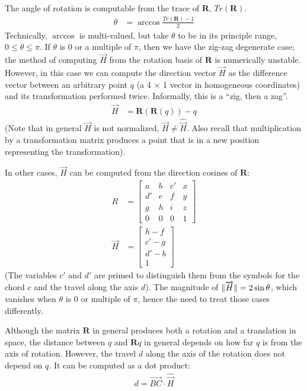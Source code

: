 \documentclass[11pt]{article}
\DeclarePairedDelimiter{\norm}{\lVert}{\rVert}
\begin{document}
{The angle of rotation is computable from the trace of $\bm{R}$, $Tr(\bm{R})$.
\begin{align}
  \theta &= \arccos{\frac{Tr(\bm{R}) - 1}{2}}
\end{align}
Technically, $\arccos$ is multi-valued, but take $\theta$
to be in its principle range, $0 \leq \theta \leq \pi$.
If $\theta$ is $0$ or a multiple of $\pi$, then we have the zig-zag
degenerate case; the method of computing $\overrightarrow{H}$ from the rotation
basis of $\bm{R}$ is numerically unstable.
However, in this case
we can compute the direction vector $\overrightarrow{H}$ as the difference vector
between an arbitrary point $q$ (a 4 $\times$ 1 vector in homogeneous coordinates)
and its transformation performed
twice. Informally, this is a ``zig, then a zag''.
\begin{align}
  \overrightarrow{H} &= \bm{R} ( \bm{R}( q)) - q
\end{align}
(Note that in general $\overrightarrow{H}$ is not normalized, $\overrightarrow{H} \neq \hat{\overrightarrow{H}}$.
Also recall that multiplication by a transformation matrix
produces a point that is in a new position representing
the transformation).

In other cases, $\overrightarrow{H}$ can be computed from the direction
cosines of $\bm{R}$\cite{wiki:rotation}:
\begin{align}
  R &=     \begin{bmatrix} a & b & c' & x \\ d' & e & f & y\\ g & h & i & z\\ 0 &  0 & 0 & 1\end{bmatrix} \\
    \overrightarrow{H} &=  \begin{bmatrix} h - f \\ c' - g \\ d' - b \\ 1 \end{bmatrix}
\end{align}
(The variables $c'$ and $d'$ are primed to distinguish them from
the symbols for the chord $c$ and the travel along the axis $d$).
The magnitude of $\norm{\overrightarrow{H}} = 2 \sin{\theta}$, which vanishes
when $\theta$ is $0$ or multiple of $\pi$, hence the need
to treat those cases differently.

Although the matrix $\bm{R}$ in general produces both a rotation
and a translation in space, the distance between $q$ and $\bm{R}q$
in general depends on how far $q$ is from the axis of rotation.
However, the travel $d$ along the axis of the rotation does
not depend on $q$. It can be computed as a dot product:
\begin{align}
  d = \overrightarrow{BC} \cdot \hat{\overrightarrow{H}}
\end{align}

}
\end{document}
